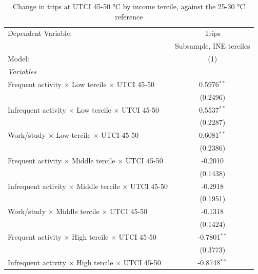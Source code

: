 
\begin{table}[htbp]
   \caption{\label{table_model_d_45-50} Change in trips at UTCI 45-50 °C by income tercile, against the 25-30 °C reference}
   \centering
   \small
   \begin{tabular}{lc}
      \tabularnewline \midrule \midrule
      Dependent Variable:                                               & Trips\\  
                                                                        & Subsample, INE terciles \\   
      Model:                                                            & (1)\\  
      \midrule
      \emph{Variables}\\
      Frequent activity $\times$ Low tercile $\times$ UTCI 45-50        & 0.5976$^{**}$\\   
                                                                        & (0.2496)\\   
      Infrequent activity $\times$ Low tercile $\times$ UTCI 45-50      & 0.5537$^{**}$\\   
                                                                        & (0.2287)\\   
      Work/study $\times$ Low tercile $\times$ UTCI 45-50               & 0.6081$^{**}$\\   
                                                                        & (0.2386)\\   
      Frequent activity $\times$ Middle tercile $\times$ UTCI 45-50     & -0.2010\\   
                                                                        & (0.1438)\\   
      Infrequent activity $\times$ Middle tercile $\times$ UTCI 45-50   & -0.2918\\   
                                                                        & (0.1951)\\   
      Work/study $\times$ Middle tercile $\times$ UTCI 45-50            & -0.1318\\   
                                                                        & (0.1424)\\   
      Frequent activity $\times$ High tercile $\times$ UTCI 45-50       & -0.7801$^{**}$\\   
                                                                        & (0.3773)\\   
      Infrequent activity $\times$ High tercile $\times$ UTCI 45-50     & -0.8748$^{**}$\\   

\end{tabular}
\end{table}
